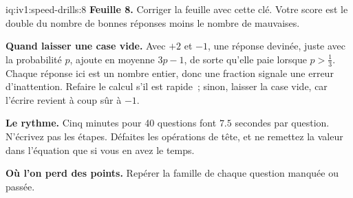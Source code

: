\enlargethispage{-1\baselineskip}%
\begin{solution}{iq:iv1:speed-drills:8}
\textbf{Feuille 8.} Corriger la feuille avec cette clé. Votre score est le double du nombre de bonnes réponses moins le nombre de mauvaises.
\par\nopagebreak


\textbf{Quand laisser une case vide.} Avec $+2$ et $-1$, une réponse devinée, juste avec la probabilité $p$, ajoute en moyenne $3p - 1$, de sorte qu'elle paie lorsque $p > \tfrac13$. Chaque réponse ici est un nombre entier, donc une fraction signale une erreur d'inattention. Refaire le calcul s'il est rapide~; sinon, laisser la case vide, car l'écrire revient à coup sûr à $-1$.

\textbf{Le rythme.} Cinq minutes pour 40 questions font $7.5$ secondes par question. N'écrivez pas les étapes. Défaites les opérations de tête, et ne remettez la valeur dans l'équation que si vous en avez le temps.

\textbf{Où l'on perd des points.} Repérer la famille de chaque question manquée ou passée.


\end{solution}

